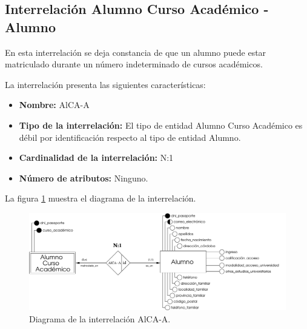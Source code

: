 \subsection{Interrelación Alumno Curso Académico - Alumno}

   \begin{description}
      \item[Definición] En esta interrelación se deja constancia de que un
      alumno puede estar matriculado durante un número indeterminado de cursos
      académicos.

      \item[Características] La interrelación presenta las siguientes
                             características:

         \begin{itemize}
            \item \textbf{Nombre:} AlCA-A
            \item \textbf{Tipo de la interrelación:} El tipo de entidad
                  Alumno Curso Académico es débil por identificación respecto al
                  tipo de entidad Alumno.
            \item \textbf{Cardinalidad de la interrelación:} N:1
            \item \textbf{Número de atributos:} Ninguno.
         \end{itemize}

      \item[Diagrama] La figura \ref{diagramaAlCA-A} muestra el diagrama de la
                      interrelación.

      \item \begin{figure}[!ht]
            \begin{center}
            \includegraphics[]{07.Modelo_Entidad-Interrelacion/7.3.Analisis_Interrelaciones/diagramas/AlCA-A.pdf}
            \caption{Diagrama de la interrelación AlCA-A.}
            \label{diagramaAlCA-A}
            \end{center}
         \end{figure}


\end{description}
